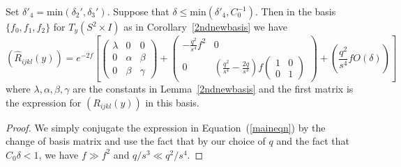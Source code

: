 \begin{lemma}
\label{lem:rhat-matrix-adapted-basis}
\label{Rhatmatrix} Set $\delta'_4=\mathrm{min}(\delta_2',\delta_3')$.  Suppose
that $\delta\le \mathrm{min}(\delta'_4,C_0^{-1})$. Then in the basis
$\{f_0,f_1,f_2\}$ for $T_y(S^2\times I)$ as in Corollary~\ref{2ndnewbasis} we
have
$$(\hat R_{ijkl}(y)) =e^{-2f}\left[\begin{pmatrix} \lambda & 0 & 0
\\ 0 & \alpha & \beta \\ 0 & \beta  & \gamma\end{pmatrix}
+\begin{pmatrix} -\frac{q^2}{s^4}f^2 & 0  \\ 0 &
\left(\frac{q^2}{s^4}-\frac{2q}{s^3}\right)f\begin{pmatrix} 1 & 0
\\ 0 & 1\end{pmatrix}
\end{pmatrix}+\left(\frac{q^2}{s^4}fO(\delta)\right)\right]$$
where $\lambda,\alpha,\beta,\gamma$ are the constants in
Lemma~\ref{2ndnewbasis} and the first matrix is the expression for
$(R_{ijkl}(y))$ in this basis.
\end{lemma}


\begin{proof}
We simply conjugate the expression in Equation~(\ref{maineqn}) by the change of
basis matrix and use the fact that by our choice of $q$ and the fact that
$C_0\delta<1$, we have $f\gg  f^2$ and $q/s^3\ll q^2/s^4$.
\end{proof}

